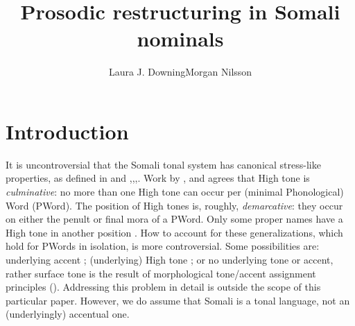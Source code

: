 \documentclass[output=paper]{langscibook}
\author{Laura J. Downing\lastand Morgan Nilsson\affiliation{University of Gothenburg, Sweden}}
\title{Prosodic restructuring in Somali nominals}
\begin{document}
 
\maketitle


\section{Introduction}
\label{sec:downing:1}
It is uncontroversial that the Somali tonal system has canonical stress-like properties, as defined in \cite{Downing2010} and \citet{Hyman2006},\citet{Hyman2011},\citet{Hyman2012},\citet{Hyman2014}. Work by \citet{Hyman1981,Hyman2006,Hyman2012,LeGac2003,Green2016}, and \citet{Saeed2004} agrees that High tone is \textit{culminative}: no more than one High tone can occur per (minimal Phonological) Word (PWord). The position of High tones is, roughly, \textit{demarcative}: they occur on either the penult or final mora of a PWord. Only some proper names have a High tone in another position \citep[22]{Saeed1999}. How to account for these generalizations, which hold for PWords in isolation, is more controversial. Some possibilities are: underlying accent \citep{Banti1988,Green2016,LeGac2003}; (underlying) High tone \citep{Andrzejewski1964,Andrzejewski1979,Andrzejewski1981,Armstrong1934,Hyman2006,Hyman2014,LeGac2016}; or no underlying tone or accent, rather surface tone is the result of morphological tone\slash accent assignment principles (\citealt{Hyman1981,Mous2009}). Addressing this problem in detail is outside the scope of this particular paper. However, we do assume that Somali is a tonal language, not an (underlyingly) accentual one.
\end{document}
